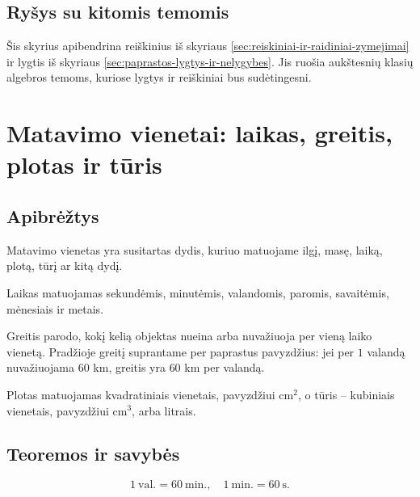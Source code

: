 \subsection{Ryšys su kitomis temomis}

Šis skyrius apibendrina reiškinius iš skyriaus \ref{sec:reiskiniai-ir-raidiniai-zymejimai} ir lygtis iš skyriaus \ref{sec:paprastos-lygtys-ir-nelygybes}. Jis ruošia aukštesnių klasių algebros temoms, kuriose lygtys ir reiškiniai bus sudėtingesni.

\section{Matavimo vienetai: laikas, greitis, plotas ir tūris}\label{sec:matavimo-vienetai-laikas-greitis-plotas-turis}

\subsection{Apibrėžtys}

\begin{apibreztis}
Matavimo vienetas yra susitartas dydis, kuriuo matuojame ilgį, masę, laiką, plotą, tūrį ar kitą dydį.
\end{apibreztis}

\begin{apibreztis}
Laikas matuojamas sekundėmis, minutėmis, valandomis, paromis, savaitėmis, mėnesiais ir metais.
\end{apibreztis}

\begin{apibreztis}
Greitis parodo, kokį kelią objektas nueina arba nuvažiuoja per vieną laiko vienetą. Pradžioje greitį suprantame per paprastus pavyzdžius: jei per \(1\) valandą nuvažiuojama \(60\) km, greitis yra \(60\) km per valandą.
\end{apibreztis}

\begin{apibreztis}
Plotas matuojamas kvadratiniais vienetais, pavyzdžiui \(\text{cm}^2\), o tūris -- kubiniais vienetais, pavyzdžiui \(\text{cm}^3\), arba litrais.
\end{apibreztis}

\subsection{Teoremos ir savybės}

\begin{savybe}
\[
1\ \text{val.}=60\ \text{min.},\quad 1\ \text{min.}=60\ \text{s}.
\]
\end{savybe}


